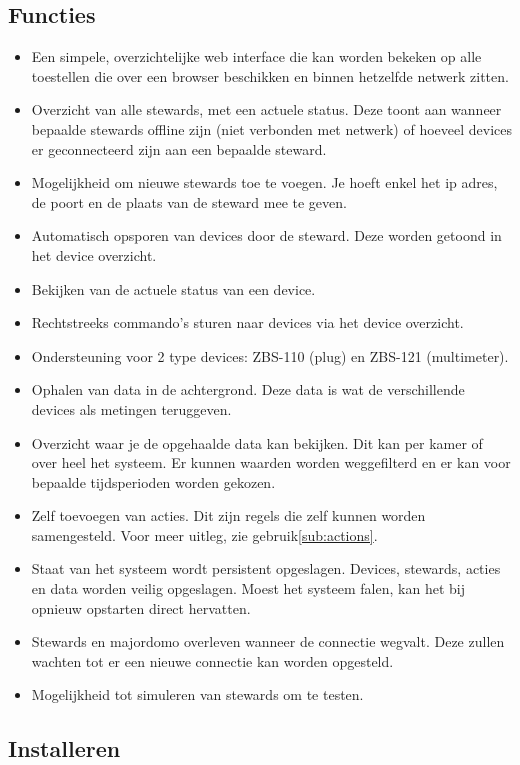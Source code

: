 \documentclass{article}
\begin{document}
\subsection{Functies}
\label{sub:features}
\begin{itemize}
\item Een simpele, overzichtelijke web interface die kan worden bekeken op alle toestellen die over een browser beschikken en binnen hetzelfde netwerk zitten.
\item Overzicht van alle stewards, met een actuele status. Deze toont aan wanneer bepaalde stewards offline zijn (niet verbonden met netwerk) of hoeveel devices er geconnecteerd zijn aan een bepaalde steward.
\item Mogelijkheid om nieuwe stewards toe te voegen. Je hoeft enkel het ip adres, de poort en de plaats van de steward mee te geven.
\item Automatisch opsporen van devices door de steward. Deze worden getoond in het device overzicht.
\item Bekijken van de actuele status van een device.
\item Rechtstreeks commando's sturen naar devices via het device overzicht. 
\item Ondersteuning voor 2 type devices: ZBS-110 (plug) en ZBS-121 (multimeter).
\item Ophalen van data in de achtergrond. Deze data is wat de verschillende devices als metingen teruggeven.
\item Overzicht waar je de opgehaalde data kan bekijken. Dit kan per kamer of over heel het systeem. Er kunnen waarden worden weggefilterd en er kan voor bepaalde tijdsperioden worden gekozen.
\item Zelf toevoegen van acties. Dit zijn regels die zelf kunnen worden samengesteld. Voor meer uitleg, zie gebruik\ref{sub:actions}.
\item Staat van het systeem wordt persistent opgeslagen. Devices, stewards, acties en data worden veilig opgeslagen. Moest het systeem falen, kan het bij opnieuw opstarten direct hervatten.
\item Stewards en majordomo overleven wanneer de connectie wegvalt. Deze zullen wachten tot er een nieuwe connectie kan worden opgesteld.
\item Mogelijkheid tot simuleren van stewards om te testen.
\end{itemize}

\subsection{Installeren}
\label{sub:install}
\end{document}
